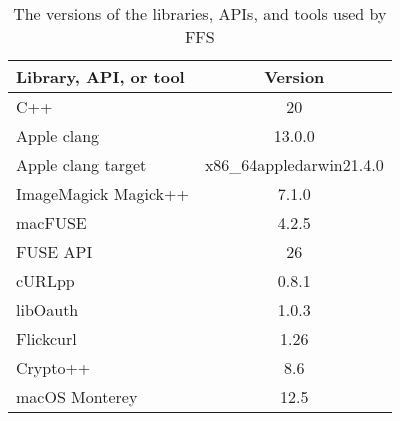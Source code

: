 \begin{table}[!ht]
	\begin{center}
		\caption{The versions of the libraries, \gls{API}s, and tools used by \gls{FFS}}
		\begin{tabular}{| l || c |}
			
			\hline

			\textbf{Library, \gls{API}, or tool} & \textbf{Version}\\
			
			\hline
			\hline
			
				C++						& 20 \\
				Apple clang 			& 13.0.0\\
				Apple clang target		& x86\_64\-apple\-darwin21.4.0\\
				ImageMagick Magick++	& 7.1.0\-29\\
				macFUSE					& 4.2.5 \\
				FUSE \gls{API}				& 26 \\
				cURLpp					& 0.8.1 \\
				libOauth				& 1.0.3 \\
				Flickcurl				& 1.26 \\
				Crypto++				& 8.6 \\
				macOS Monterey			& 12.5\\

			\hline
		\end{tabular}
		\label{tbl:dev_env}
	\end{center}

\end{table}
